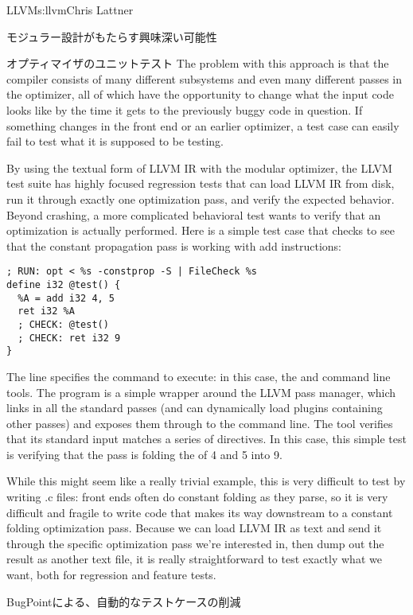 \begin{aosachapter}{LLVM}{s:llvm}{Chris Lattner}
\begin{aosasect1}{モジュラー設計がもたらす興味深い可能性}
\begin{aosasect2}{オプティマイザのユニットテスト}
The problem with this approach is that the compiler consists of many
different subsystems and even many different passes in the optimizer,
all of which have the opportunity to change what the input code looks
like by the time it gets to the previously buggy code in question.  If
something changes in the front end or an earlier optimizer, a test
case can easily fail to test what it is supposed to be testing.

By using the textual form of LLVM IR with the modular optimizer, the
LLVM test suite has highly focused regression tests that can load LLVM
IR from disk, run it through exactly one optimization pass, and verify
the expected behavior.  Beyond crashing, a more complicated behavioral
test wants to verify that an optimization is actually performed.  Here
is a simple test case that checks to see that the constant propagation
pass is working with add instructions:

\begin{verbatim}
; RUN: opt < %s -constprop -S | FileCheck %s
define i32 @test() {
  %A = add i32 4, 5
  ret i32 %A
  ; CHECK: @test()
  ; CHECK: ret i32 9
}
\end{verbatim}

\noindent The  line specifies the command to execute: in this case,
the  and  command line tools.  The
 program is a simple wrapper around the LLVM pass manager,
which links in all the standard passes (and can dynamically load
plugins containing other passes) and exposes them through to the
command line.  The  tool verifies that its standard
input matches a series of  directives.  In this case, this
simple test is verifying that the  pass is folding the
 of 4 and 5 into 9.

While this might seem like a really trivial example, this is very
difficult to test by writing .c files: front ends often do constant
folding as they parse, so it is very difficult and fragile to write
code that makes its way downstream to a constant folding optimization
pass.  Because we can load LLVM IR as text and send it through the
specific optimization pass we're interested in, then dump out the
result as another text file, it is really straightforward to test
exactly what we want, both for regression and feature tests.

\end{aosasect2}

\begin{aosasect2}{BugPointによる、自動的なテストケースの削減}


\end{aosasect2}
\end{aosasect1}
\end{aosachapter}
